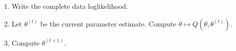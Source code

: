 \documentclass[a4paper,10pt,fleqn]{article}
\newcommand{\eqsp}{\,}
\newcommand{\bP}{\mathbb{P}}
\newcommand{\1}{\ensuremath{\mathbbm{1}}}
\begin{document}
\begin{enumerate}
\item Write the complete data loglikelihood.

%
\item Let $\theta^{(t)}$ be the current parameter estimate. Compute $\theta\mapsto Q(\theta,\theta^{(t)})$.

%
\item Compute $\theta^{(t+1)}$.


\end{enumerate}
\end{document}
